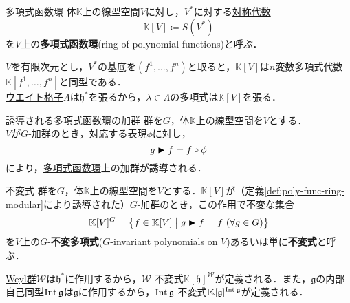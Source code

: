 \documentclass[rep_main]{subfiles}
\begin{document}
\begin{mydef}[label=def:polynomial-function-ring]{多項式函数環}
	体$\mathbb{K}$上の線型空間$V$に対し，$V^*$に対する\hyperref[label=def:sym-alg]{対称代数}
	\begin{equation}
		\mathbb{K}[V] \coloneqq S(V^*)
	\end{equation}
	を$V$上の\textbf{多項式函数環}(ring of polynomial functions)と呼ぶ．
\end{mydef}
$V$を有限次元とし，$V^*$の基底を$(f^1,\ldots , f^n)$と取ると，$\mathbb{K}[V]$は$n$変数多項式代数$\mathbb{K}[f^1, \ldots, f^n]$と同型である．\\
\hyperref[def:root-lattice]{ウエイト格子}$\Lambda$は$\mathfrak{h}^*$を張るから，$\lambda \in \Lambda$の多項式は$\mathbb{K}[V]$を張る．
\begin{mydef}[label=def:poly-func-ring-modular]{誘導される多項式函数環の加群}
	群を$G$，体$\mathbb{K}$上の線型空間を$V$とする．\\
	$V$が$G$-加群のとき，対応する表現$\phi$に対し，
	\begin{equation}
		g \blacktriangleright f = f \circ \phi
	\end{equation}
	により，\hyperref[def:polynomial-function-ring]{多項式函数環}上の加群が誘導される．
\end{mydef}
\begin{mydef}[label=def:invariant-polynomial]{不変式}
	群を$G$，体$\mathbb{K}$上の線型空間を$V$とする．$\mathbb{K}[V]$が（定義\ref{def:poly-func-ring-modular}により誘導された）$G$-加群のとき，この作用で不変な集合
	\begin{equation}
		\mathbb{K}[V]^G = \bigl\{f \in \mathbb{K}[V] \bigm| g \blacktriangleright f = f\ (\forall g \in G) \bigr\}
	\end{equation}
	を$V$上の$G$-\textbf{不変多項式}($G$-invariant polynomials on $V$)あるいは単に\textbf{不変式}と呼ぶ．
\end{mydef}
\hyperref[def:Weylgroup]{Weyl群}$\mathscr{W}$は$\mathfrak{h}^*$に作用するから，$\mathscr{W}$-不変式$\mathbb{K}[\mathfrak{h}]^\mathscr{W}$が定義される．また，$\mathfrak{g}$の内部自己同型$\operatorname{Int}\mathfrak{g}$は$\mathfrak{g}$に作用するから，$\operatorname{Int}\mathfrak{g}$-不変式$\mathbb{K}[\mathfrak{g}]^{\operatorname{Int}\mathfrak{g}}$が定義される．
\end{document}
